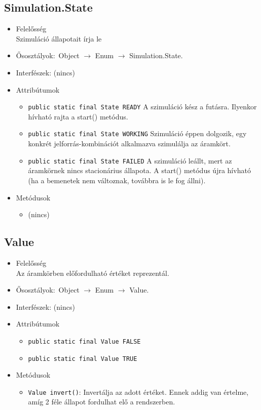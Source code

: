 \subsection{Simulation.State}
\begin{itemize}
\item Felelősség\\
Szimuláció állapotait írja le
\item Ősosztályok:\ Object $\rightarrow{}$ Enum $\rightarrow{}$ Simulation.State.
\item Interfészek: (nincs)
\item Attribútumok $\ $
\begin{itemize}
	\item \texttt{public static final State READY} A szimuláció kész a futásra. Ilyenkor hívható rajta a start() metódus.
	\item \texttt{public static final State WORKING} Szimuláció éppen dolgozik, egy konkrét jelforrás-kombinációt alkalmazva szimulálja az áramkört.
	\item \texttt{public static final State FAILED} A szimuláció leállt, mert az áramkörnek nincs stacionárius állapota. A start() metódus újra hívható (ha a bemenetek nem változnak, továbbra is le fog állni).
\end{itemize}
\item Metódusok$\ $
\begin{itemize}
\item (nincs)
\end{itemize}
\end{itemize}

\subsection{Value}
\begin{itemize}
\item Felelősség\\
Az áramkörben előfordulható értéket reprezentál.
\item Ősosztályok:\ Object $\rightarrow{}$ Enum $\rightarrow{}$ Value.
\item Interfészek: (nincs)
\item Attribútumok $\ $
\begin{itemize}
	\item \texttt{public static final Value FALSE} 
	\item \texttt{public static final Value TRUE} 
\end{itemize}
\item Metódusok$\ $
\begin{itemize}
	\item \texttt{Value invert()}: Invertálja az adott értéket. Ennek addig van értelme, amíg 2 féle  állapot fordulhat elő a rendszerben.
\end{itemize}
\end{itemize}


